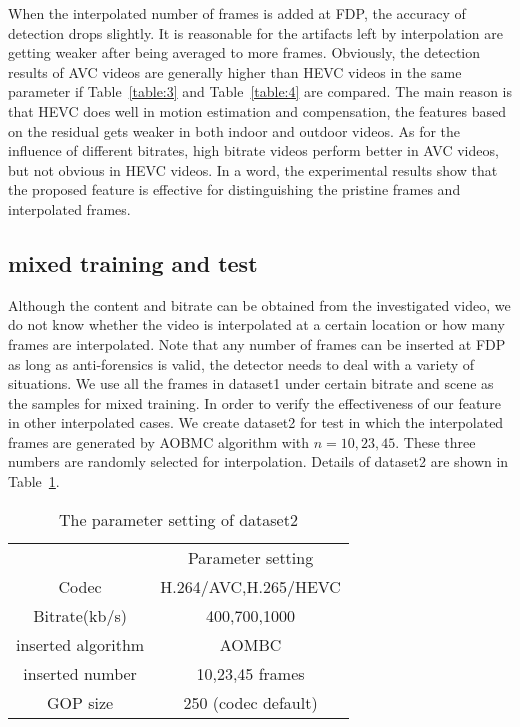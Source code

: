 \documentclass[pdftex,twocolumn,epjc3]{svjour3}          %
\begin{document}
When the interpolated number of frames is added at FDP, the accuracy of detection drops slightly. It is reasonable for the artifacts left by interpolation are getting weaker after being averaged
to more frames. Obviously, the detection results of AVC videos are generally higher than HEVC videos in the same parameter if Table~\ref{table:3} and Table~\ref{table:4} are compared. The main reason is that HEVC does well in motion estimation and compensation, the features based on
the residual gets weaker in both indoor and outdoor videos. As for the influence of different bitrates,
high bitrate videos perform better in AVC videos, but not obvious in HEVC videos. In a word, the experimental results show that the proposed feature is effective for distinguishing the pristine frames and interpolated frames.

\subsection{mixed training and test}
Although the content and bitrate can be obtained from the investigated video, we do not know whether the video is interpolated at a certain location or how many frames are interpolated. Note that any number of frames can be inserted at FDP as long as anti-forensics is valid, the detector needs to deal with a variety of situations. We use all the frames in dataset1 under certain bitrate and scene as the samples for mixed training. In order to verify the effectiveness of our feature in other interpolated cases. We create dataset2 for test in which the interpolated frames are generated by AOBMC algorithm with $n = 10,23,45$. These three numbers are randomly selected for interpolation. Details of dataset2 are shown in Table~\ref{table:5}.

\begin{table}[h]
\renewcommand\arraystretch{1.5}
    \caption{The parameter setting of dataset2}\label{table:5}
    \begin{center}
        \begin{tabular*}{7cm}{cc}
            \hline
            \ & Parameter setting\\
            \noalign{\smallskip}\hline\noalign{\smallskip}
            Codec & H.264/AVC,H.265/HEVC  \\
            Bitrate(kb/s) & 400,700,1000  \\
            inserted algorithm & AOMBC  \\
            inserted number & 10,23,45 frames\\
            GOP size & 250 (codec default)
            \\ \hline
        \end{tabular*}
    \end{center}
\end{table}
\end{document}
